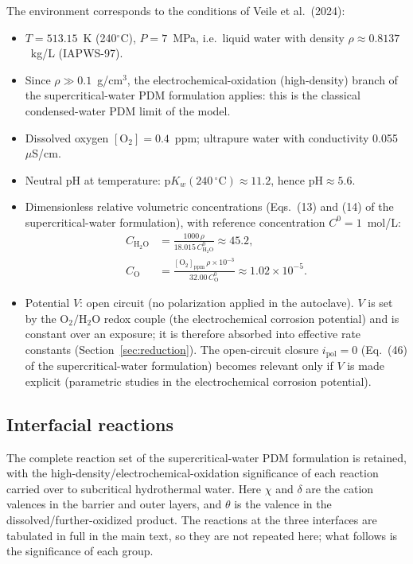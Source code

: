The environment corresponds to the conditions of Veile et al.\ (2024):
\begin{itemize}
\item $T = 513.15$~K (240$^\circ$C), $P = 7$~MPa, i.e.\ liquid water with density
$\rho \approx 0.8137$~kg/L (IAPWS-97).
\item Since $\rho \gg 0.1$~g/cm$^3$, the electrochemical-oxidation
(high-density) branch of the supercritical-water PDM formulation applies: this
is the classical condensed-water PDM limit of the model.
\item Dissolved oxygen $[\mathrm{O_2}] = 0.4$~ppm; ultrapure water with
conductivity 0.055~$\mu$S/cm.
\item Neutral pH at temperature: $\mathrm{p}K_w(240\,^\circ\mathrm{C}) \approx 11.2$,
hence $\mathrm{pH} \approx 5.6$.
\item Dimensionless relative volumetric concentrations
(Eqs.~(13) and (14) of the supercritical-water formulation), with reference
concentration $C^0 = 1$~mol/L:
\begin{align}
C_{\mathrm{H_2O}} &= \frac{1000\,\rho}{18.015\, C^0_{\mathrm{H_2O}}} \approx 45.2 , \\
C_{\mathrm{O}} &= \frac{[\mathrm{O_2}]_{\mathrm{ppm}}\,\rho \times 10^{-3}}{32.00\, C^0_{\mathrm{O}}}
\approx 1.02 \times 10^{-5} .
\end{align}
\item Potential $V$: open circuit (no polarization applied in the autoclave).
$V$ is set by the $\mathrm{O_2/H_2O}$ redox couple (the electrochemical
corrosion potential) and is constant over an exposure; it is therefore absorbed
into effective rate constants (Section~\ref{sec:reduction}). The open-circuit
closure $i_{\mathrm{pol}} = 0$ (Eq.~(46) of the supercritical-water
formulation) becomes relevant only if $V$ is made explicit (parametric studies
in the electrochemical corrosion potential).
\end{itemize}

\subsection{Interfacial reactions}
\label{sec:reactions}

The complete reaction set of the supercritical-water PDM formulation is
retained, with the high-density/electrochemical-oxidation significance of each
reaction carried over to subcritical hydrothermal water. Here $\chi$ and
$\delta$ are the cation valences in the barrier and outer layers, and $\theta$
is the valence in the dissolved/further-oxidized product. The reactions at the
three interfaces are tabulated in full in the main text, so they are not
repeated here; what follows is the significance of each group.

